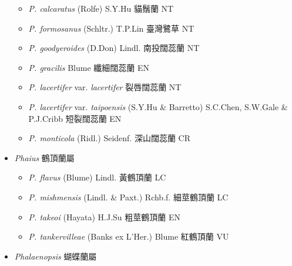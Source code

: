 \begin{itemize}
  \begin{itemize}
        \item[] \textit{P. calcaratus} (Rolfe) S.Y.Hu  貓鬚蘭   NT
        \item[] \textit{P. formosanus} (Schltr.) T.P.Lin  臺灣鷺草   NT
        \item[] \textit{P. goodyeroides} (D.Don) Lindl.  南投闊蕊蘭   NT
        \item[] \textit{P. gracilis} Blume  纖細闊蕊蘭   EN
        \item[] \textit{P. lacertifer} var. \textit{lacertifer}   裂唇闊蕊蘭   NT
        \item[] \textit{P. lacertifer} var. \textit{taipoensis} (S.Y.Hu \& Barretto) S.C.Chen, S.W.Gale \& P.J.Cribb  短裂闊蕊蘭   EN
        \item[] \textit{P. monticola} (Ridl.) Seidenf.  深山闊蕊蘭   CR
  \end{itemize}
 \item[] \textit{Phaius} 鶴頂蘭屬
                                
  \begin{itemize}
        \item[] \textit{P. flavus} (Blume) Lindl.  黃鶴頂蘭   LC
        \item[] \textit{P. mishmensis} (Lindl. \& Paxt.) Rchb.f.  細莖鶴頂蘭   LC
        \item[] \textit{P. takeoi} (Hayata) H.J.Su  粗莖鶴頂蘭   EN
        \item[] \textit{P. tankervilleae} (Banks ex L'Her.) Blume  紅鶴頂蘭   VU
  \end{itemize}
 \item[] \textit{Phalaenopsis} 蝴蝶蘭屬
                                

\end{itemize}
